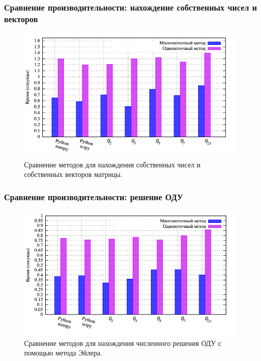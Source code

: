 \documentclass[10pt,professionalfont,utf8,presentation,compress]{beamer}
\theoremstyle{definition}
\theoremstyle{plain}
\begin{document}
\begin{frame}
\frametitle{Сравнение производительности: нахождение собственных чисел и векторов}
\begin{figure}[H]
\centerline{\includegraphics[width=0.95\linewidth]{../gnuplot/multi/jacoby/plot.png}}
\caption{Сравнение методов для нахождения собственных чисел и собственных векторов матрицы.}
\label{img:multi:jacoby}
\end{figure}

\end{frame}

\begin{frame}
\frametitle{Сравнение производительности: решение ОДУ}
\begin{figure}[H]
\centerline{\includegraphics[width=0.95\linewidth]{../gnuplot/multi/euler/plot.png}}
\caption{Сравнение методов для нахождения численного решения ОДУ с помощью метода Эйлера.}
\label{img:multi:ode:euler}
\end{figure}
\end{frame}
\end{document}
